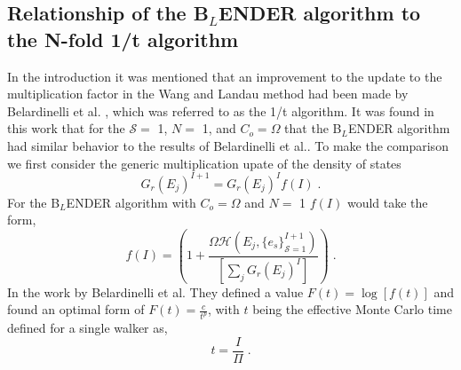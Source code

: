 \documentclass[aps,pre,reprint,superscriptaddress,showkeys]{revtex4-1}
\begin{document}
\subsection{Relationship of the B$_L$ENDER algorithm to the N-fold 1/t algorithm}
\label{test_wl}
In the introduction it was mentioned that an improvement to the update to the multiplication factor in the Wang and Landau method had been made by Belardinelli et al. \cite{saturation}, which was referred to as the 1/t algorithm. It was found in this work that for the $\mathcal{S}=$ 1, $N=$ 1, and $C_{o}=\Omega$ that the B$_L$ENDER algorithm had similar behavior to the results of Belardinelli et al.. To make the comparison we first consider the generic multiplication upate of the density of states
\begin{equation}
G_{r}(E_j)^{I+1} = G_{r}(E_j)^{I}f(I)\;.
\label{orignialform}
\end{equation}
For the B$_L$ENDER algorithm with $C_o = \Omega$ and $N=$ 1 $f(I)$ would take the form, 
\begin{equation}
f(I) = ( 1 +  \frac{\Omega \mathcal{H}(E_j,\{e_s\}_{\mathcal{S}=1}^{I+1}) }{ [\sum_j G_{r}(E_j)^{I}] } )\;.
\label{fequiv}
\end{equation}
In the work by Belardinelli et al. They defined a value $F(t) = \log[f(t)]$  and found an optimal form of $F(t) = \frac{c}{t^p}$, with $t$ being the effective Monte Carlo time defined for a single walker as,
\begin{equation}
t = \frac{I}{\Pi} \;.
\label{mcstep}
\end{equation} 
\end{document}
